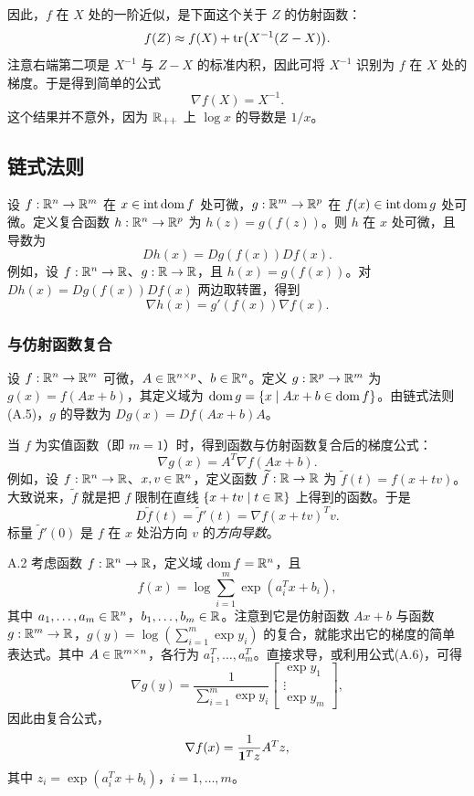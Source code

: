 因此，$f$ 在 $X$ 处的一阶近似，是下面这个关于 $Z$ 的仿射函数：
\[
 f(Z)\approx f(X)+\operatorname{tr}\bigl(X^{-1}(Z-X)\bigr).
\]
注意右端第二项是 $X^{-1}$ 与 $Z-X$ 的标准内积，因此可将 $X^{-1}$ 识别为 $f$ 在 $X$ 处的梯度。于是得到简单的公式
\[
 \nabla f(X)=X^{-1}.
\]
这个结果并不意外，因为 $\mathbb R_{++}$ 上 $\log x$ 的导数是 $1/x$。

\subsection{链式法则}
设 $f:\mathbb R^n\to\mathbb R^m$ 在 $x\in\operatorname{int}\operatorname{dom} f$ 处可微，$g:\mathbb R^m\to\mathbb R^p$ 在 $f(x)\in\operatorname{int}\operatorname{dom} g$ 处可微。定义复合函数 $h:\mathbb R^n\to\mathbb R^p$ 为 $h(z)=g(f(z))$。则 $h$ 在 $x$ 处可微，且导数为
\begin{equation}
 Dh(x)=Dg(f(x))Df(x).\tag{A.5}
\end{equation}
例如，设 $f:\mathbb R^n\to\mathbb R$、$g:\mathbb R\to\mathbb R$，且 $h(x)=g(f(x))$。对 $Dh(x)=Dg(f(x))Df(x)$ 两边取转置，得到
\begin{equation}
 \nabla h(x)=g'(f(x))\nabla f(x).\tag{A.6}
\end{equation}

\subsubsection*{与仿射函数复合}
设 $f:\mathbb R^n\to\mathbb R^m$ 可微，$A\in\mathbb R^{n\times p}$、$b\in\mathbb R^n$。定义 $g:\mathbb R^p\to\mathbb R^m$ 为 $g(x)=f(Ax+b)$，其定义域为 $\operatorname{dom} g=\{x\mid Ax+b\in\operatorname{dom} f\}$。由链式法则(A.5)，$g$ 的导数为 $Dg(x)=Df(Ax+b)A$。

当 $f$ 为实值函数（即 $m=1$）时，得到函数与仿射函数复合后的梯度公式：
\[
 \nabla g(x)=A^T\nabla f(Ax+b).
\]
例如，设 $f:\mathbb R^n\to\mathbb R$、$x,v\in\mathbb R^n$，定义函数 $\widetilde f:\mathbb R\to\mathbb R$ 为 $\widetilde f(t)=f(x+tv)$。大致说来，$\widetilde f$ 就是把 $f$ 限制在直线 $\{x+tv\mid t\in\mathbb R\}$ 上得到的函数。于是
\[
 D\widetilde f(t)=\widetilde f'(t)=\nabla f(x+tv)^Tv.
\]
标量 $\widetilde f'(0)$ 是 $f$ 在 $x$ 处沿方向 $v$ 的\emph{方向导数}。

\begin{origexample}{A.2}
考虑函数 $f:\mathbb R^n\to\mathbb R$，定义域 $\operatorname{dom} f=\mathbb R^n$，且
\[
 f(x)=\log\sum_{i=1}^m\exp(a_i^Tx+b_i),
\]
其中 $a_1,\ldots,a_m\in\mathbb R^n$，$b_1,\ldots,b_m\in\mathbb R$。注意到它是仿射函数 $Ax+b$ 与函数 $g:\mathbb R^m\to\mathbb R$，$g(y)=\log(\sum_{i=1}^m\exp y_i)$ 的复合，就能求出它的梯度的简单表达式。其中 $A\in\mathbb R^{m\times n}$，各行为 $a_1^T,\ldots,a_m^T$。直接求导，或利用公式(A.6)，可得
\begin{equation}
 \nabla g(y)=\frac1{\sum_{i=1}^m\exp y_i}
 \begin{bmatrix}\exp y_1\\\vdots\\\exp y_m\end{bmatrix},\tag{A.7}
\end{equation}
因此由复合公式，
\[
 \nabla f(x)=\frac1{\mathbf 1^Tz}A^Tz,
\]
其中 $z_i=\exp(a_i^Tx+b_i)$，$i=1,\ldots,m$。
\end{origexample}

